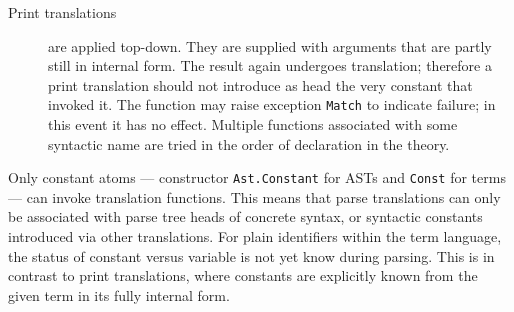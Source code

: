 \begin{isabellebody}
\begin{isamarkuptext}
\begin{description}
  \item [Print translations] are applied top-down.  They are supplied
  with arguments that are partly still in internal form.  The result
  again undergoes translation; therefore a print translation should
  not introduce as head the very constant that invoked it.  The
  function may raise exception \verb|Match| to indicate failure; in
  this event it has no effect.  Multiple functions associated with
  some syntactic name are tried in the order of declaration in the
  theory.

  \end{description}

  Only constant atoms --- constructor \verb|Ast.Constant| for ASTs and
  \verb|Const| for terms --- can invoke translation functions.  This
  means that parse translations can only be associated with parse tree
  heads of concrete syntax, or syntactic constants introduced via
  other translations.  For plain identifiers within the term language,
  the status of constant versus variable is not yet know during
  parsing.  This is in contrast to print translations, where constants
  are explicitly known from the given term in its fully internal form.%
\end{isamarkuptext}%
\isamarkuptrue%
%
\isadelimtheory
%
\endisadelimtheory
%
\isatagtheory
{}\isamarkupfalse%
%
\endisatagtheory
{\isafoldtheory}%
%
\isadelimtheory
%
\endisadelimtheory
\isanewline
\end{isabellebody}%
